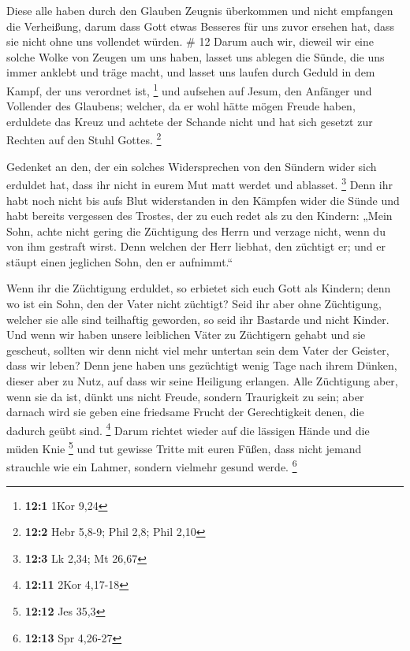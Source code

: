  Diese alle haben durch den Glauben Zeugnis überkommen und
nicht empfangen die Verheißung,  darum dass Gott etwas
Besseres für uns zuvor ersehen hat, dass sie nicht ohne uns vollendet
würden. \# 12  Darum auch wir, dieweil wir eine solche Wolke
von Zeugen um uns haben, lasset uns ablegen die Sünde, die uns immer
anklebt und träge macht, und lasset uns laufen durch Geduld in dem
Kampf, der uns verordnet ist, \footnote{\textbf{12:1} 1Kor 9,24}
 und aufsehen auf Jesum, den Anfänger und Vollender des
Glaubens; welcher, da er wohl hätte mögen Freude haben, erduldete das
Kreuz und achtete der Schande nicht und hat sich gesetzt zur Rechten auf
den Stuhl Gottes. \footnote{\textbf{12:2} Hebr 5,8-9; Phil 2,8; Phil
  2,10}

 Gedenket an den, der ein solches Widersprechen von den
Sündern wider sich erduldet hat, dass ihr nicht in eurem Mut matt werdet
und ablasset. \footnote{\textbf{12:3} Lk 2,34; Mt 26,67} 
Denn ihr habt noch nicht bis aufs Blut widerstanden in den Kämpfen wider
die Sünde  und habt bereits vergessen des Trostes, der zu
euch redet als zu den Kindern: „Mein Sohn, achte nicht gering die
Züchtigung des Herrn und verzage nicht, wenn du von ihm gestraft wirst.
 Denn welchen der Herr liebhat, den züchtigt er; und er
stäupt einen jeglichen Sohn, den er aufnimmt.``

 Wenn ihr die Züchtigung erduldet, so erbietet sich euch
Gott als Kindern; denn wo ist ein Sohn, den der Vater nicht züchtigt?
 Seid ihr aber ohne Züchtigung, welcher sie alle sind
teilhaftig geworden, so seid ihr Bastarde und nicht Kinder. 
Und wenn wir haben unsere leiblichen Väter zu Züchtigern gehabt und sie
gescheut, sollten wir denn nicht viel mehr untertan sein dem Vater der
Geister, dass wir leben?  Denn jene haben uns gezüchtigt
wenig Tage nach ihrem Dünken, dieser aber zu Nutz, auf dass wir seine
Heiligung erlangen.  Alle Züchtigung aber, wenn sie da ist,
dünkt uns nicht Freude, sondern Traurigkeit zu sein; aber darnach wird
sie geben eine friedsame Frucht der Gerechtigkeit denen, die dadurch
geübt sind. \footnote{\textbf{12:11} 2Kor 4,17-18}  Darum
richtet wieder auf die lässigen Hände und die müden Knie \footnote{\textbf{12:12}
  Jes 35,3}  und tut gewisse Tritte mit euren Füßen, dass
nicht jemand strauchle wie ein Lahmer, sondern vielmehr gesund werde.
\footnote{\textbf{12:13} Spr 4,26-27}

